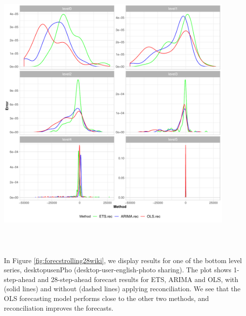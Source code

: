 \documentclass[11pt,a4paper,]{article}
\let\origfigure\figure
\let\endorigfigure\endfigure
\renewenvironment{figure}[1][2] {
    \expandafter\origfigure\expandafter[htbp]
} {
    \endorigfigure
}
\begin{document}
\begin{figure}

{\centering \includegraphics[width=450px,height=550px]{Paper-Figures/results_Wikipedia/densityplot_28} 

}

\caption{Density plot for forecast errors -  Reconciled and unreconciled ETS, ARIMA and OLS in each hierarchy level for 28-step-ahead Wikipedia pageviews}\label{fig:densityplotwiki}
\end{figure}

In Figure \ref{fig:forecstrolling28wiki}, we display results for one of the bottom level series, desktopusenPho (desktop-user-english-photo sharing). The plot shows 1-step-ahead and 28-step-ahead forecast results for ETS, ARIMA and OLS, with (solid lines) and without (dashed lines) applying reconciliation. We see that the OLS forecasting model performs close to the other two methods, and reconciliation improves the forecasts.
\end{document}
